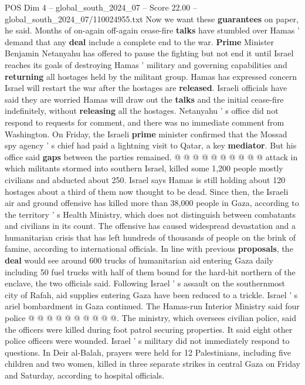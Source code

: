 \begin{textsample}{POS Dim 4 – global\_south\_2024\_07 – Score 22.00 – global\_south\_2024\_07/110024955.txt}
Now we want these \textbf{guarantees} on paper, he said.
Months of on-again off-again cease-fire \textbf{talks} have stumbled over Hamas ' demand that any \textbf{deal} include a complete end to the war. \textbf{Prime} Minister Benjamin Netanyahu has offered to pause the fighting but not end it until Israel reaches its goals of destroying Hamas ' military and governing capabilities and \textbf{returning} all hostages held by the militant group.
Hamas has expressed concern Israel will restart the war after the hostages are \textbf{released}.
Israeli officials have said they are worried Hamas will draw out the \textbf{talks} and the initial cease-fire indefinitely, without \textbf{releasing} all the hostages.
Netanyahu ' s office did not respond to requests for comment, and there was no immediate comment from Washington.
On Friday, the Israeli \textbf{prime} minister confirmed that the Mossad spy agency ' s chief had paid a lightning visit to Qatar, a key \textbf{mediator}.
But his office said \textbf{gaps} between the parties remained. @ @ @ @ @ @ @ @ @ @ attack in which militants stormed into southern Israel, killed some 1,200 people mostly civilians and abducted about 250.
Israel says Hamas is still holding about 120 hostages about a third of them now thought to be dead.
Since then, the Israeli air and ground offensive has killed more than 38,000 people in Gaza, according to the territory ' s Health Ministry, which does not distinguish between combatants and civilians in its count.
The offensive has caused widespread devastation and a humanitarian crisis that has left hundreds of thousands of people on the brink of famine, according to international officials.
In line with previous \textbf{proposals}, the \textbf{deal} would see around 600 trucks of humanitarian aid entering Gaza daily including 50 fuel trucks with half of them bound for the hard-hit northern of the enclave, the two officials said.
Following Israel ' s assault on the southernmost city of Rafah, aid supplies entering Gaza have been reduced to a trickle.
Israel ' s ariel bombardment in Gaza continued.
The Hamas-run Interior Ministry said four police @ @ @ @ @ @ @ @ @ @.
The ministry, which oversees civilian police, said the officers were killed during foot patrol securing properties.
It said eight other police officers were wounded.
Israel ' s military did not immediately respond to questions.
In Deir al-Balah, prayers were held for 12 Palestinians, including five children and two women, killed in three separate strikes in central Gaza on Friday and Saturday, according to hospital officials.

\end{textsample}
